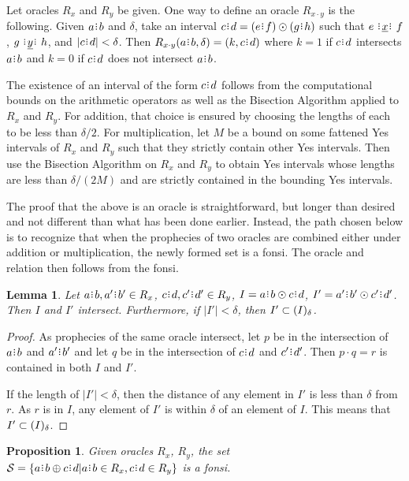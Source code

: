 \documentclass[12pt]{article}
\newtheorem{lemma}{Lemma}[section]
\newtheorem{proposition}{Proposition}[section]
\begin{document}
Let oracles $R_x$ and $R_y$ be given. One way to define an oracle $R_{x \cdot y}$ is the following. Given $a\rint b$ and $\delta$, take an interval $c\rint d = (e\rint f) \odot (g\rint h)$ such that $e \xrel f$, $g\xrel[y] h$, and $|c\rint d| < \delta$. Then $R_{x \cdot y}(a\rint b, \delta) = (k, c\rint d)$ where $k=1$ if $c\rint d$ intersects $a\rint b$ and $k=0$ if $c \rint d$ does not intersect $a\rint b$. 

The existence of an interval of the form $c\rint d$ follows from the computational bounds on the arithmetic operators as well as the Bisection Algorithm applied to $R_x$ and $R_y$. For addition, that choice is ensured by choosing the lengths of each to be less than $\delta/2$. For multiplication, let $M$ be a bound on some fattened Yes intervals of $R_x$ and $R_y$ such that they strictly contain other Yes intervals. Then use the Bisection Algorithm on $R_x$ and $R_y$ to obtain Yes intervals whose lengths are less than $\delta/(2M)$ and are strictly contained in the bounding Yes intervals. 

The proof that the above is an oracle is straightforward, but longer than desired and not different than what has been done earlier. Instead, the path chosen below is to recognize that when the prophecies of two oracles are combined either under addition or multiplication, the newly formed set is a fonsi. The oracle and relation then follows from the fonsi. 

\begin{lemma}
    Let $a\rint b, a'\rint b' \in R_{x}$, $c\rint d, c'\rint d' \in R_y$, $I =  a\rint b \odot c\rint d$, $I' =  a'\rint b' \odot c'\rint d'$. Then $I$ and $I'$ intersect. Furthermore, if $|I'| < \delta$, then $I' \subset (I)_{\delta}$.
\end{lemma}

\begin{proof}   
    As prophecies of the same oracle intersect, let $p$ be in the intersection of $a\rint b$ and $a'\rint b'$ and let $q$ be in the intersection of $c\rint d$ and $c'\rint d'$. Then $p \cdot q = r$ is contained in both $I$ and $I'$. 
    
    If the length of $|I'| < \delta$, then the distance of any element in $I'$ is less than $\delta$ from $r$. As $r$ is in $I$, any element of $I'$ is within $\delta$ of an element of $I$. This means that $I' \subset (I)_{\delta}$.
\end{proof}


\begin{proposition}
    Given oracles $R_x$, $R_y$, the set $\mathcal{S} = \{a\rint b \oplus c\rint d| a\rint b \in R_x, c\rint d \in R_y\}$ is a fonsi. 
\end{proposition}
\end{document}
